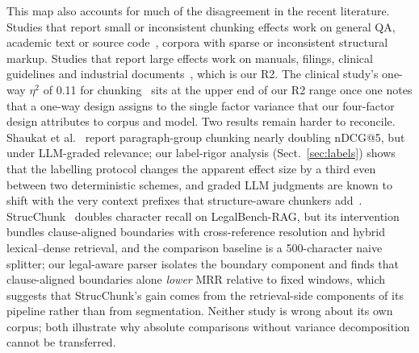 \documentclass[runningheads]{llncs}
\begin{document}
This map also accounts for much of the disagreement in the recent literature. Studies that report small or inconsistent chunking effects work on general QA, academic text or source code~\cite{bennani2026systematic,caspari2026complex,kreileder2026academic,li2025enhancing}, corpora with sparse or inconsistent structural markup. Studies that report large effects work on manuals, filings, clinical guidelines and industrial documents~\cite{taiwo2026oilgas,gomezcabello2025clinical,demoura2026adaptive,jimenoyepes2024financial}, which is our R2. The clinical study's one-way $\eta^2$ of 0.11 for chunking~\cite{gomezcabello2025clinical} sits at the upper end of our R2 range once one notes that a one-way design assigns to the single factor variance that our four-factor design attributes to corpus and model. Two results remain harder to reconcile. Shaukat et al.~\cite{shaukat2026systematic} report paragraph-group chunking nearly doubling nDCG@5, but under LLM-graded relevance; our label-rigor analysis (Sect.~\ref{sec:labels}) shows that the labelling protocol changes the apparent effect size by a third even between two deterministic schemes, and graded LLM judgments are known to shift with the very context prefixes that structure-aware chunkers add~\cite{yang2026titlechain}. StrucChunk~\cite{singh2026strucchunk} doubles character recall on LegalBench-RAG, but its intervention bundles clause-aligned boundaries with cross-reference resolution and hybrid lexical--dense retrieval, and the comparison baseline is a 500-character naive splitter; our legal-aware parser isolates the boundary component and finds that clause-aligned boundaries alone \emph{lower} MRR relative to fixed windows, which suggests that StrucChunk's gain comes from the retrieval-side components of its pipeline rather than from segmentation. Neither study is wrong about its own corpus; both illustrate why absolute comparisons without variance decomposition cannot be transferred.
\end{document}
